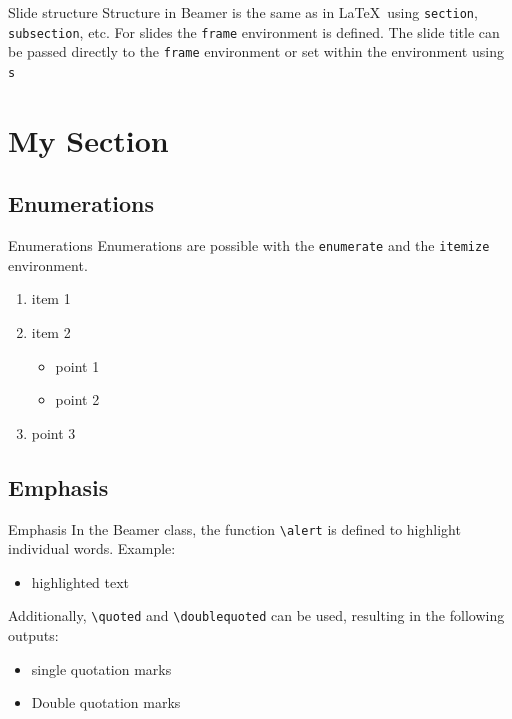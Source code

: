 \documentclass[xcolor={svgnames},12pt,aspectratio=169,handout]{beamer}
\begin{document}
\begin{frame}[fragile]{Slide structure}
    Structure in Beamer is the same as in \LaTeX\ using \lstinline!section!, \lstinline!subsection!, etc. For slides the \lstinline!frame! environment is defined.
    The slide title can be passed directly to the \lstinline!frame! environment or set within the environment using \lstinline!s!
\end{frame}

\section{My Section}

\subsection{Enumerations}

\begin{frame}[fragile]{Enumerations}
    Enumerations are possible with the \lstinline!enumerate! and the \lstinline!itemize! environment.

    \begin{enumerate}
        \item item 1
        \item item 2
        \begin{itemize}
            \item point 1
            \item point 2
        \end{itemize}
        \item point 3
    \end{enumerate}
\end{frame}

\subsection{Emphasis}

\begin{frame}[fragile]{Emphasis}
    In the Beamer class, the function \lstinline!\alert! is defined to highlight individual words. Example:

    \begin{itemize}
        \item \alert{highlighted text}
    \end{itemize}

    Additionally, \lstinline!\quoted! and \lstinline!\doublequoted! can be used, resulting in the following outputs:

    \begin{itemize}
        \item[] single quotation marks
        \item[] Double quotation marks
    \end{itemize}
\end{frame}
\end{document}
